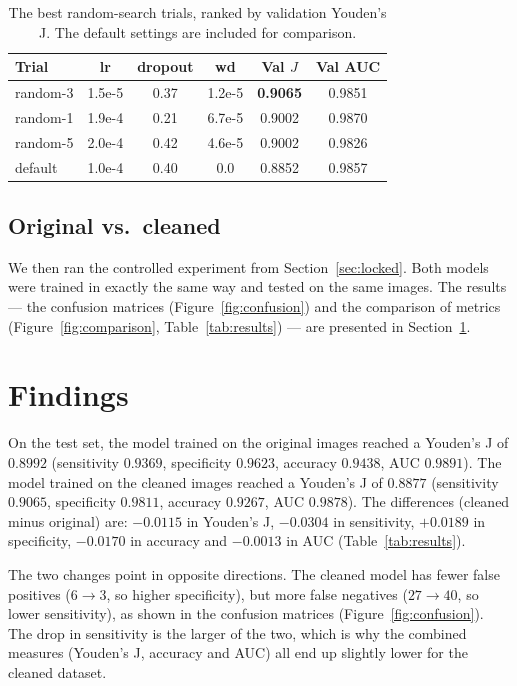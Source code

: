 \documentclass[10pt,twocolumn]{article}
\begin{document}
\begin{table}[t]
\centering
\caption{The best random-search trials, ranked by validation Youden's J. The
default settings are included for comparison.}
\label{tab:search}
\small
\begin{tabular}{lccccc}
\toprule
Trial & lr & dropout & wd & Val $J$ & Val AUC\\
\midrule
random-3 & 1.5e\textnormal{-}5 & 0.37 & 1.2e\textnormal{-}5 & \textbf{0.9065} & 0.9851\\
random-1 & 1.9e\textnormal{-}4 & 0.21 & 6.7e\textnormal{-}5 & 0.9002 & 0.9870\\
random-5 & 2.0e\textnormal{-}4 & 0.42 & 4.6e\textnormal{-}5 & 0.9002 & 0.9826\\
default  & 1.0e\textnormal{-}4 & 0.40 & 0.0 & 0.8852 & 0.9857\\
\bottomrule
\end{tabular}
\end{table}

\subsection{Original vs.\ cleaned}
We then ran the controlled experiment from Section~\ref{sec:locked}. Both models
were trained in exactly the same way and tested on the same images. The results
--- the confusion matrices (Figure~\ref{fig:confusion}) and the comparison of
metrics (Figure~\ref{fig:comparison}, Table~\ref{tab:results}) --- are presented
in Section~\ref{sec:findings}.

\section{Findings}
\label{sec:findings}
On the test set, the model trained on the original images reached a Youden's J of
$0.8992$ (sensitivity $0.9369$, specificity $0.9623$, accuracy $0.9438$, AUC
$0.9891$). The model trained on the cleaned images reached a Youden's J of
$0.8877$ (sensitivity $0.9065$, specificity $0.9811$, accuracy $0.9267$, AUC
$0.9878$). The differences (cleaned minus original) are: $-0.0115$ in Youden's J,
$-0.0304$ in sensitivity, $+0.0189$ in specificity, $-0.0170$ in accuracy and
$-0.0013$ in AUC (Table~\ref{tab:results}).

The two changes point in opposite directions. The cleaned model has fewer false
positives ($6\!\rightarrow\!3$, so higher specificity), but more false negatives
($27\!\rightarrow\!40$, so lower sensitivity), as shown in the confusion matrices
(Figure~\ref{fig:confusion}). The drop in sensitivity is the larger of the two,
which is why the combined measures (Youden's J, accuracy and AUC) all end up
slightly lower for the cleaned dataset.
\end{document}
